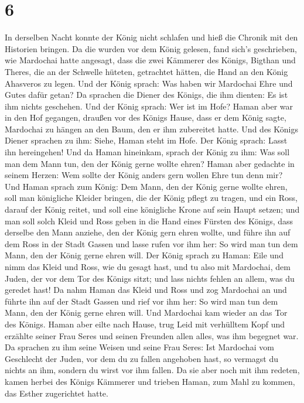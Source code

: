 \hypertarget{section-5}{%
\section{6}\label{section-5}}

 In derselben Nacht konnte der König nicht schlafen und
hieß die Chronik mit den Historien bringen. Da die wurden vor dem König
gelesen,  fand sich's geschrieben, wie Mardochai hatte
angesagt, dass die zwei Kämmerer des Königs, Bigthan und Theres, die an
der Schwelle hüteten, getrachtet hätten, die Hand an den König Ahasveros
zu legen.  Und der König sprach: Was haben wir Mardochai
Ehre und Gutes dafür getan? Da sprachen die Diener des Königs, die ihm
dienten: Es ist ihm nichts geschehen.  Und der König
sprach: Wer ist im Hofe? Haman aber war in den Hof gegangen, draußen vor
des Königs Hause, dass er dem König sagte, Mardochai zu hängen an den
Baum, den er ihm zubereitet hatte.  Und des Königs Diener
sprachen zu ihm: Siehe, Haman steht im Hofe. Der König sprach: Lasst ihn
hereingehen!  Und da Haman hineinkam, sprach der König zu
ihm: Was soll man dem Mann tun, den der König gerne wollte ehren? Haman
aber gedachte in seinem Herzen: Wem sollte der König anders gern wollen
Ehre tun denn mir?  Und Haman sprach zum König: Dem Mann,
den der König gerne wollte ehren,  soll man königliche
Kleider bringen, die der König pflegt zu tragen, und ein Ross, darauf
der König reitet, und soll eine königliche Krone auf sein Haupt setzen;
 und man soll solch Kleid und Ross geben in die Hand eines
Fürsten des Königs, dass derselbe den Mann anziehe, den der König gern
ehren wollte, und führe ihn auf dem Ross in der Stadt Gassen und lasse
rufen vor ihm her: So wird man tun dem Mann, den der König gerne ehren
will.  Der König sprach zu Haman: Eile und nimm das Kleid
und Ross, wie du gesagt hast, und tu also mit Mardochai, dem Juden, der
vor dem Tor des Königs sitzt; und lass nichts fehlen an allem, was du
geredet hast!  Da nahm Haman das Kleid und Ross und zog
Mardochai an und führte ihn auf der Stadt Gassen und rief vor ihm her:
So wird man tun dem Mann, den der König gerne ehren will.
 Und Mardochai kam wieder an das Tor des Königs. Haman
aber eilte nach Hause, trug Leid mit verhülltem Kopf  und
erzählte seiner Frau Seres und seinen Freunden allen alles, was ihm
begegnet war. Da sprachen zu ihm seine Weisen und seine Frau Seres: Ist
Mardochai vom Geschlecht der Juden, vor dem du zu fallen angehoben hast,
so vermagst du nichts an ihm, sondern du wirst vor ihm fallen.
 Da sie aber noch mit ihm redeten, kamen herbei des
Königs Kämmerer und trieben Haman, zum Mahl zu kommen, das Esther
zugerichtet hatte.

